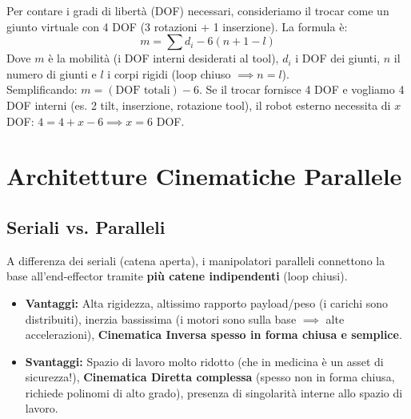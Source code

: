 \documentclass[11pt,a4paper,twoside]{report}
\begin{document}
\begin{mathbox}
Per contare i gradi di libertà (DOF) necessari, consideriamo il trocar come un giunto virtuale con 4 DOF (3 rotazioni + 1 inserzione). La formula è:
\begin{equation}
    m = \sum d_i - 6(n + 1 - l)
\end{equation}
Dove $m$ è la mobilità (i DOF interni desiderati al tool), $d_i$ i DOF dei giunti, $n$ il numero di giunti e $l$ i corpi rigidi (loop chiuso $\implies n = l$).\\
Semplificando: $m = (\text{DOF totali}) - 6$.
Se il trocar fornisce 4 DOF e vogliamo 4 DOF interni (es. 2 tilt, inserzione, rotazione tool), il robot esterno necessita di $x$ DOF: $4 = 4 + x - 6 \implies x = 6$ DOF.
\end{mathbox}


\chapter{Architetture Cinematiche Parallele}

\section{Seriali vs. Paralleli}
A differenza dei seriali (catena aperta), i manipolatori paralleli connettono la base all'end-effector tramite \textbf{più catene indipendenti} (loop chiusi).
\begin{itemize}
    \item \textbf{Vantaggi:} Alta rigidezza, altissimo rapporto payload/peso (i carichi sono distribuiti), inerzia bassissima (i motori sono sulla base $\implies$ alte accelerazioni), \textbf{Cinematica Inversa spesso in forma chiusa e semplice}.
    \item \textbf{Svantaggi:} Spazio di lavoro molto ridotto (che in medicina è un asset di sicurezza!), \textbf{Cinematica Diretta complessa} (spesso non in forma chiusa, richiede polinomi di alto grado), presenza di singolarità interne allo spazio di lavoro.
\end{itemize}
\end{document}
